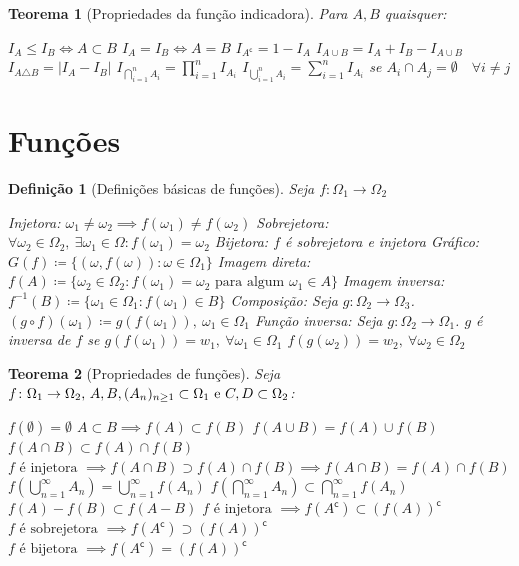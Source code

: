 \documentclass[12pt,a4paper,answers]{article}
\numberwithin{equation}{section} %
\newcommand{\cp}[1]{#1^\mathsf{c}} %
\newcommand{\inv}[1]{#1^{-1}}      %
\theoremstyle{thm_estilo}
\newtheorem{theorem}{Teorema}[section]
\newtheorem{definition}{Definição}[section]
\theoremstyle{thm_note_est}
\begin{document}
\begin{theorem}[Propriedades da função indicadora] Para $A,B$ quaisquer:
	\begin{outline}[enumerate]
		\1 \(I_A \leq I_B \iff A\subset B\)
		\1 \(I_A = I_B \iff A=B\)
		\1 \(I_{\cp{A}} = 1 - I_A \)
		\1 \(I_{A\cup B} = I_A + I_B - I_{A\cup B}\)
		\1 \(I_{A\triangle B} = |I_A - I_B|\)
		\1 \(I_{\bigcap_{i=1}^n A_i} = \prod_{i=1}^{n}I_{A_i}\)
		\1 \(I_{\bigcup_{i=1}^n A_i} = \sum_{i=1}^{n}I_{A_i}\) se $A_i\cap A_j =\emptyset \quad \forall i\neq j$
	\end{outline}
\end{theorem}

\section{Funções}

\begin{definition}[Definições básicas de funções] Seja $f\colon\Omega_1 \to \Omega_2$
	\begin{outline}[]
		\1 Injetora: \(\omega_1\neq\omega_2 \implies f(\omega_1)\neq f(\omega_2) \)
		\1 Sobrejetora: \(\forall \omega_2 \in \Omega_2, \ \exists \omega_1 \in \Omega: f(\omega_1)=\omega_2\)
		\1 Bijetora: $f$ é sobrejetora e injetora
		\1 Gráfico: \(G(f) \coloneq \{(\omega,f(\omega)): \omega \in \Omega_1\}\)
		\1 Imagem direta: \(f(A) \coloneq \{\omega_2\in\Omega_2: f(\omega_1)=\omega_2 \text{ para algum } \omega_1 \in A\}\)
		\1 Imagem inversa: \(\inv{f}(B) \coloneq \{\omega_1\in\Omega_1: f(\omega_1) \in B\}\)
		\1 Composição: Seja $g: \Omega_2 \to \Omega_3$. \((g\circ f) (\omega_1) \coloneq g(f(\omega_1)), \ \omega_1 \in \Omega_1\)
		\1 Função inversa: Seja $g: \Omega_2 \to \Omega_1$. $g$ é inversa de $f$ se 
			\2 \(g(f(\omega_1)) = w_1, \ \forall \omega_1 \in \Omega_1\)
			\2 \(f(g(\omega_2)) = w_2, \ \forall \omega_2 \in \Omega_2\)
 	\end{outline}
\end{definition}

\begin{theorem}[Propriedades de funções] Seja \(f\colon\Omega_1 \to \Omega_2$, $A, B, (A_n)_{n\geq1} \subset \Omega_1$ e $C,D  \subset \Omega_2 \):
	\begin{outline}[enumerate]
		\1 \(f(\emptyset) = \emptyset\)
		\1 \(A \subset B \implies f(A) \subset f(B)\)
		\1 \( f(A\cup B) = f(A)\cup f(B) \)
		\1 \( f(A\cap B) \subset f(A)\cap f(B) \)
		\1 \( f \text{ é injetora } \implies f(A\cap B) \supset f(A)\cap f(B) \implies  f(A\cap B) = f(A)\cap f(B) \)
		\1 \(f\left( \bigcup_{n=1}^\infty A_n \right) = \bigcup_{n=1}^\infty f(A_n) \)
		\1 \(f\left( \bigcap_{n=1}^\infty A_n \right) \subset \bigcap_{n=1}^\infty f(A_n) \)
		\1 \(f(A)-f(B) \subset f(A-B)\)
		\1 \( f \text{ é injetora } \implies f(\cp{A}) \subset \cp{\left(f(A)\right)} \)
		\1 \( f \text{ é sobrejetora } \implies f(\cp{A}) \supset \cp{\left(f(A)\right)} \)
		\1 \( f \text{ é bijetora } \implies f(\cp{A}) = \cp{\left(f(A)\right)} \)
	\end{outline}
\end{theorem}
\end{document}
